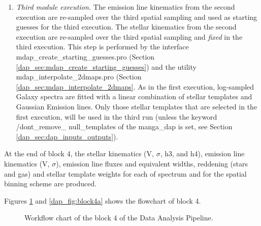 \documentclass[11pt]{book}
\begin{document}
\begin{enumerate}
\item {\it Third module execution.} The emission line kinematics from
  the second execution are re-sampled over the third spatial sampling
  and used as starting guesses for the third execution. The stellar
  kinematics from the second execution are re-sampled over the third
  spatial sampling and {\it fixed} in the third execution. This step
  is performed by the interface mdap\_create\_starting\_guesses.pro
  (Section \ref{dap_sec:mdap_create_starting_guesses}) and the utility
  mdap\_interpolate\_2dmaps.pro (Section
  \ref{dap_sec:mdap_interpolate_2dmaps}. As in the first execution,
  log-sampled Galaxy spectra are fitted with a linear combination of
  stellar templates and Gaussian Emission lines. Only those stellar
  templates that are selected in the first execution, will be used in
  the third run (unless the keyword /dont\_remove\_ null\_templates of
  the manga\_dap is set, see Section
  \ref{dap_sec:dap_inputs_outputs}).


\end{enumerate}


At the end of block 4, the stellar kinematics (V, $\sigma$, h3, and
h4), emission line kinematics (V, $\sigma$), emission line fluxes and
equivalent widths, reddening (stars and gas) and stellar template
weights for each of spectrum and for the spatial binning scheme are
produced.

Figures \ref{dap_fig:block4} and \ref{dap_fig:block4a} shows the
flowchart of block 4.

\begin{figure}
\begin{center}
\caption{Workflow chart of the block 4 of the Data Analysis Pipeline.}
 \label{dap_fig:block4}
\end{center}
\end{figure}




\end{document}
